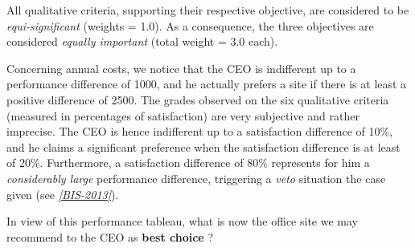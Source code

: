 \documentclass[letterpaper,10pt,english]{sphinxmanual}
\begin{document}
All qualitative criteria, supporting their respective objective, are considered to be \emph{equi-significant} (weights = 1.0). As a consequence, the three objectives are considered \emph{equally important} (total weight = 3.0 each).

Concerning annual costs, we notice that the CEO is indifferent up to a performance difference of 1000\texteuro{}, and he actually prefers a site if there is at least a positive difference of 2500\texteuro{}. The grades observed on the six qualitative criteria (measured in percentages of satisfaction) are very subjective and rather imprecise. The CEO is hence indifferent up to a satisfaction difference of 10\%, and he claims a significant preference when the satisfaction difference is at least of 20\%.  Furthermore, a satisfaction difference of 80\% represents for him a \emph{considerably large} performance difference, triggering a \emph{veto} situation the case given (see \label{tutorial:id22}{\hyperref[tutorial:bis-2013]{\emph{{[}BIS-2013{]}}}}).

In view of this performance tableau, what is now the office site we may recommend to the CEO as \textbf{best choice} ?
\end{document}
